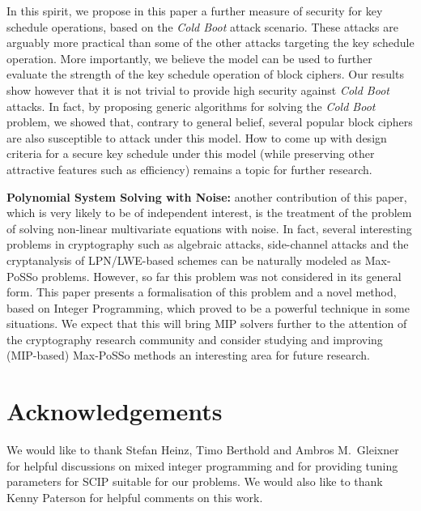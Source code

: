 \documentclass{llncs}
\newcommand{\coldboot}{\emph{Cold Boot}\xspace}
\begin{document}
In this spirit, we propose in this paper a further measure of security for key schedule operations, based on the \coldboot attack scenario. These attacks are arguably more practical than some of the other attacks targeting the key schedule operation. More importantly, we believe the model can be used to further evaluate the strength of the key schedule operation of block ciphers. Our results show however that it is not trivial to provide high security against \coldboot attacks. In fact, by proposing generic algorithms for solving the \coldboot problem, we showed that, contrary to general belief, several popular block ciphers are also susceptible to attack under this model. How to come up with design criteria for a secure key schedule under this model (while preserving
other attractive features such as efficiency) remains a topic for further research.

{\bf Polynomial System Solving with Noise: } another contribution of this paper, which is very likely to be of independent interest, is the treatment of the problem of solving non-linear multivariate equations with noise. In fact, several interesting problems in cryptography such as algebraic attacks, side-channel attacks and the crypt\-analysis of LPN/LWE-based schemes can be naturally modeled as Max-PoSSo problems. However, so far this problem was not considered in its general form. This paper presents a formalisation of this problem and a novel method, based on Integer Programming, which proved to be a powerful technique in some situations. We expect that this will bring MIP solvers further to the attention of the cryptography research community and consider studying and improving (MIP-based) Max-PoSSo methods an interesting area for future research.

\section{Acknowledgements}
We would like to thank Stefan Heinz, Timo Berthold and Ambros M.\ Gleixner for helpful discussions on mixed integer programming and for providing tuning parameters for SCIP suitable for our problems. We would also like to thank Kenny Paterson for helpful comments on this work.
\end{document}
